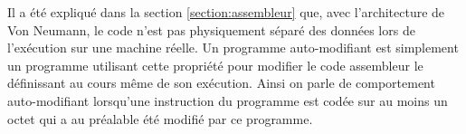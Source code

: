 
Il a été expliqué dans la section \ref{section:assembleur} que, avec l'architecture de Von Neumann, le code n'est pas physiquement séparé des données lors de l'exécution sur une machine réelle.
Un programme auto-modifiant est simplement un programme utilisant cette propriété pour modifier le code assembleur le définissant au cours même de son exécution.
Ainsi on parle de comportement auto-modifiant lorsqu'une instruction du programme est codée sur au moins un octet qui a au préalable été modifié par ce programme.


